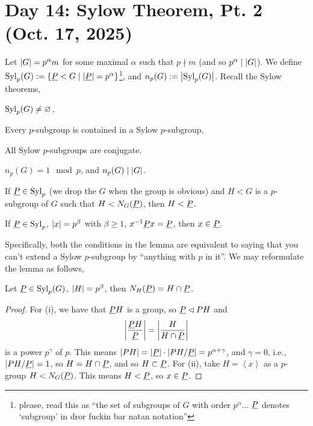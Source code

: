 \section{Day 14: Sylow Theorem, Pt. 2 (Oct. 17, 2025)}
Let $\left\lvert G \right\rvert = p^\alpha m$ for some maximal $\alpha$ such that $p \nmid m$ (and so $p^\alpha \mid \left\lvert G \right\rvert$). We define $\operatorname{Syl}_p(G) := \{\underline P < G \mid \left\lvert \underline P \right\rvert = p^\alpha\}$\footnote{please, read this as ``the set of subgroups of $G$ with order $p^\alpha$... $\underline P$ denotes `subgroup' in dror fuckin bar natan notation''}, and $n_p(G) := \left\lvert \operatorname{Syl}_p(G) \right\rvert$. Recall the Sylow theorems,
\begin{theorem}[Sylow]
    \begin{parlist}
        \item $\operatorname{Syl}_p(G) \neq \varnothing$,
        \item Every $p$-subgroup is contained in a Sylow $p$-subgroup,
        \item All Sylow $p$-subgroups are conjugate.
        \item $n_p(G) = 1 \mod p$, and $n_p(G) \mid \left\lvert G \right\rvert$.
    \end{parlist}
\end{theorem}
\begin{lemma}
    \begin{parlist}
        \item If $\underline P \in \operatorname{Syl}_p$ (we drop the $G$ when the group is obvious) and $H < G$ is a $p$-subgroup of $G$ such that $H < N_G(\underline P)$, then $H < \underline P$.
        \item If $\underline P \in \operatorname{Syl}_p$, $\left\lvert x \right\rvert = p^\beta$ with $\beta \geq 1$, $x^{-1} \underline P x = \underline P$, then $x \in \underline P$.
    \end{parlist}
\end{lemma}
\noindent Specifically, both the conditions in the lemma are equivalent to saying that you can't extend a Sylow $p$-subgroup by ``anything with $p$ in it''. We may reformulate the lemma as follows,
\begin{lemma*}
    Let $\underline P \in \operatorname{Syl}_p(G)$, $\left\lvert H \right\rvert = p^\beta$, then $N_H(\underline P) = H \cap \underline P$.
\end{lemma*}
\begin{proof}
    For (i), we have that $\underline P H$ is a group, so $\underline P \lhd P H$ and
    \[ \left\lvert \frac{\underline P H}{\underline P} \right\rvert = \left\lvert \frac{H}{H \cap \underline P} \right\rvert \]
    is a power $p^\gamma$ of $p$. This means $\left\lvert PH \right\rvert = \left\lvert \underline P \right\rvert \cdot \left\lvert PH/\underline P \right\rvert = p^{\alpha + \gamma}$, and $\gamma = 0$, i.e., $\left\lvert PH/\underline P \right\rvert = 1$, so $H = H \cap \underline P$, and so $H \subset \underline P$. For (ii), take $H = \left<x\right>$ as a $p$-group $H < N_G(\underline P)$. This means $H < \underline P$, so $x \in \underline P$.
\end{proof}
